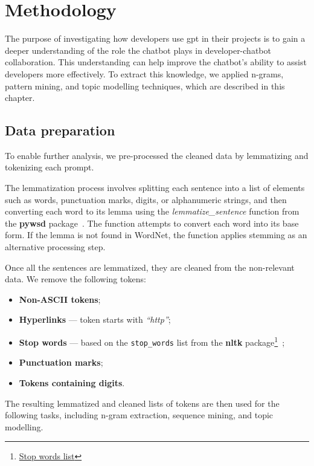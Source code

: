 \chapter{Methodology}\label{methodology}
The purpose of investigating how developers use \acrshort{gpt} in their projects is to gain a deeper understanding of the role the chatbot plays in developer-chatbot collaboration. This understanding can help improve the chatbot's ability to assist developers more effectively. To extract this knowledge, we applied n-grams, pattern mining, and topic modelling techniques, which are described in this chapter.

\section{Data preparation}\label{sec:data-prep}
To enable further analysis, we pre-processed the cleaned data by lemmatizing and tokenizing each prompt.  

The lemmatization process involves splitting each sentence into a list of elements such as words, punctuation marks, digits, or alphanumeric strings, and then converting each word to its lemma using the \textit{lemmatize\_sentence} function from the \textbf{pywsd} package~\cite{pywsd14}. The function attempts to convert each word into its base form. If the lemma is not found in WordNet, the function applies stemming as an alternative processing step.

Once all the sentences are lemmatized, they are cleaned from the non-relevant data. We remove the following tokens: 
\begin{itemize}
    \item \textbf{Non-ASCII tokens};
    \item \textbf{Hyperlinks} --- token starts with \textit{``http''};
    \item \textbf{Stop words} --- based on the \texttt{stop\_words} list from the \textbf{nltk} package\footnote{\href{https://www.geeksforgeeks.org/removing-stop-words-nltk-python/}{Stop words list}}~\cite{nltk};
    \item \textbf{Punctuation marks}; 
    \item \textbf{Tokens containing digits}.
\end{itemize}

The resulting lemmatized and cleaned lists of tokens are then used for the following tasks, including n-gram extraction, sequence mining, and topic modelling.

